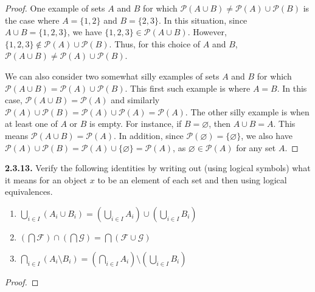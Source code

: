 \documentclass[12pt]{amsart}
\newenvironment{statement}[1]{\smallskip\noindent\color[rgb]{.6627, .3529, .6314} {\bf #1.}}{}
\theoremstyle{definition}
\theoremstyle{remark}
\begin{document}
\begin{proof}
One example of sets $A$ and $B$ for which
$\mathscr{P}(A \cup B) \neq \mathscr{P}(A) \cup \mathscr{P}(B)$
is the case where $A = \{ 1, 2 \}$ and $B = \{ 2, 3 \}$.
In this situation, since $A \cup B = \{ 1, 2, 3 \}$, we have $\{ 1, 2, 3 \} \in \mathscr{P}(A \cup B)$.
However, $\{ 1, 2, 3 \} \notin \mathscr{P}(A) \cup \mathscr{P}(B)$.
Thus, for this choice of $A$ and $B$, 
$\mathscr{P}(A \cup B) \neq \mathscr{P}(A) \cup \mathscr{P}(B)$.

We can also consider two somewhat silly examples of sets $A$ and $B$ for which
$\mathscr{P}(A \cup B) = \mathscr{P}(A) \cup \mathscr{P}(B)$.
This first such example is where $A = B$.
In this case, $\mathscr{P}(A \cup B) = \mathscr{P}(A)$
and similarly $\mathscr{P}(A) \cup \mathscr{P}(B) = \mathscr{P}(A) \cup \mathscr{P}(A)
= \mathscr{P}(A)$.
The other silly example is when at least one of $A$ or $B$ is empty.
For instance, if $B =\varnothing$, then $A \cup B = A$.
This means $\mathscr{P}(A \cup B) = \mathscr{P}(A)$.
In addition, since $\mathscr{P}(\varnothing) = \{ \varnothing \}$,
we also have $\mathscr{P}(A) \cup \mathscr{P}(B) = \mathscr{P}(A) \cup \{ \varnothing \}
= \mathscr{P}(A)$, as $\varnothing \in \mathscr{P}(A)$ for any set $A$.
\end{proof}


\begin{statement}{2.3.13}
Verify the following identities by writing out (using logical symbols) what it means for an object $x$
to be an element of each set and then using logical equivalences.
\begin{enumerate}
	\item $\bigcup_{i \in I} (A_i \cup B_i)
	= \left( \bigcup_{i \in I} A_i \right) \cup \left( \bigcup_{i \in I} B_i \right)$
	
	\item $\left( \bigcap \mathcal{F} \right) \cap \left( \bigcap \mathcal{G} \right)
	= \bigcap (\mathcal{F} \cup \mathcal{G})$
	
	\item $\bigcap_{i \in I} (A_i \setminus B_i)
	= \left( \bigcap_{i \in I} A_i \right) \setminus \left( \bigcup_{i \in I} B_i \right)$
\end{enumerate}
\end{statement}

\begin{proof}
\end{proof}
\end{document}
